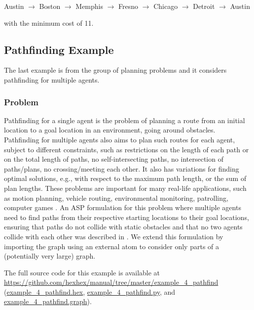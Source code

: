 \documentclass[a4paper, titlepage]{article}
\newcommand{\examplelink}[1]{\url{https://github.com/hexhex/manual/tree/master/#1}}
\newcommand{\exampledownloadlink}[2]{\href{https://github.com/hexhex/manual/raw/master/#1}{#2}}
\begin{document}
\centerline{%
Austin $\rightarrow$ Boston $\rightarrow$ Memphis $\rightarrow$ Fresno $\rightarrow$ Chicago $\rightarrow$ Detroit $\rightarrow$ Austin%
}
\smallskip

\noindent
with the minimum cost of 11. 

\subsection{Pathfinding Example}
\label{sec:pathfinding}
The last example is from the group of planning problems
and it considers pathfinding for multiple agents.
 
\subsubsection{Problem}
Pathfinding for a single agent is the problem of planning a 
route from an initial
location to a goal location in an environment, going around 
obstacles. 
Pathfinding for multiple agents also aims to plan such 
routes for each agent, 
subject to different constraints, such as restrictions on 
the length of each path 
or on the total length of paths, no self-intersecting 
paths, no intersection of 
paths/plans, no crossing/meeting each other.  It also has 
variations for finding optimal solutions, e.g., with 
respect 
to the maximum path length, or the sum of plan lengths. 
These problems are important
for many real-life applications, such as motion planning, 
vehicle routing, environmental monitoring, patrolling, 
computer games \cite{ekos2013}.
An ASP formulation for this problem
where multiple agents need to find paths 
from their respective starting locations to their goal 
locations, ensuring that 
paths do not collide with static obstacles and that no two 
agents collide with 
each other was described in \cite{ekos2013}.
We extend this formulation by importing the graph
using an external atom to consider only parts of a 
(potentially very large) graph.

The full source code for this example
is available at \examplelink{example_4_pathfind}
(\exampledownloadlink{example_4_pathfind/example_4_pathfind.hex}{example\_4\_pathfind.hex},
\exampledownloadlink{example_4_pathfind/example_4_pathfind.py}{example\_4\_pathfind.py},
and
\exampledownloadlink{example_4_pathfind/example_4_pathfind.graph}{example\_4\_pathfind.graph}).
\end{document}
